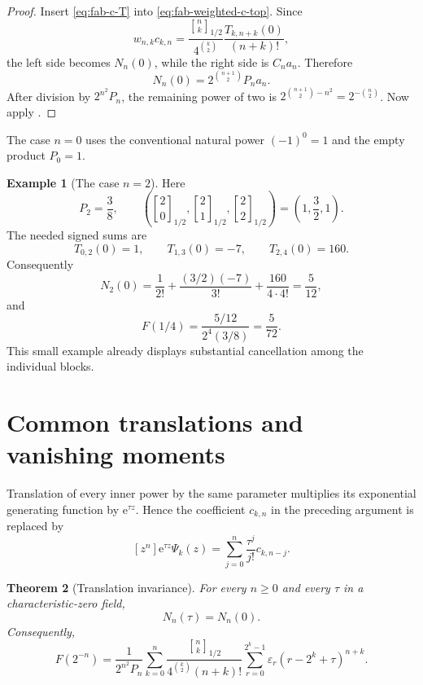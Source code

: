 \documentclass[11pt,oneside,openany]{book}
\newtheorem{theorem}{Theorem}[chapter]
\theoremstyle{definition}
\newtheorem{example}[theorem]{Example}
\theoremstyle{remark}
\newcommand{\Qbinom}[3]{\genfrac{[}{]}{0pt}{}{#1}{#2}_{#3}}
\newcommand{\e}{\mathrm e}
\begin{document}
\begin{proof}
Insert \eqref{eq:fab-c-T} into \eqref{eq:fab-weighted-c-top}.  Since
\[
 w_{n,k}c_{k,n}
 =\frac{\Qbinom nk{1/2}}{4^{\binom k2}}
   \frac{T_{k,n+k}(0)}{(n+k)!},
\]
the left side becomes $N_n(0)$, while the right side is $C_na_n$.  Therefore
\[
 N_n(0)=2^{\binom{n+1}{2}}P_na_n.
\]
After division by $2^{n^2}P_n$, the remaining power of two is
\(
 2^{\binom{n+1}{2}-n^2}=2^{-\binom n2}
\).
Now apply .
\end{proof}

The case $n=0$ uses the conventional natural power $(-1)^0=1$ and the empty product $P_0=1$.

\begin{example}[The case $n=2$]
Here
\[
 P_2=\frac38,
 \qquad
 \left(\Qbinom20{1/2},\Qbinom21{1/2},\Qbinom22{1/2}\right)
 =\left(1,\frac32,1\right).
\]
The needed signed sums are
\[
 T_{0,2}(0)=1,
 \qquad T_{1,3}(0)=-7,
 \qquad T_{2,4}(0)=160.
\]
Consequently
\[
 N_2(0)=\frac1{2!}+\frac{(3/2)(-7)}{3!}
        +\frac{160}{4\cdot4!}
 =\frac5{12},
\]
and
\[
 F(1/4)=\frac{5/12}{2^4(3/8)}=\frac5{72}.
\]
This small example already displays substantial cancellation among the individual blocks.
\end{example}

\section{Common translations and vanishing moments}

Translation of every inner power by the same parameter multiplies its exponential generating function by $\e^{\tau z}$.  Hence the coefficient $c_{k,n}$ in the preceding argument is replaced by
\[
 [z^n]\e^{\tau z}\Psi_k(z)
 =\sum_{j=0}^n\frac{\tau^j}{j!}c_{k,n-j}.
\]

\begin{theorem}[Translation invariance]\label{thm:fab-translation}
For every $n\ge0$ and every $\tau$ in a characteristic-zero field,
\begin{equation}
 N_n(\tau)=N_n(0).
 \label{eq:fab-N-translation}
\end{equation}
Consequently,
\begin{equation}
 \boxed{
 F(2^{-n})=
 \frac1{2^{n^2}P_n}
 \sum_{k=0}^n
 \frac{\Qbinom nk{1/2}}{4^{\binom k2}(n+k)!}
 \sum_{r=0}^{2^k-1}\varepsilon_r(r-2^k+\tau)^{n+k}.}
 \label{eq:fab-translated-formula}
\end{equation}
\end{theorem}
\end{document}
